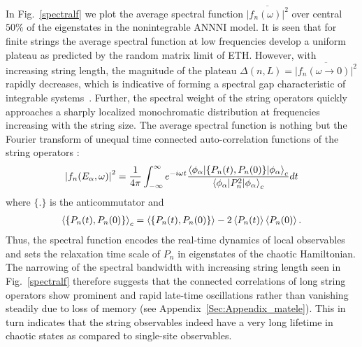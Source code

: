 \documentclass[aps,prx,twocolumn]{revtex4-2}
\begin{document}
{In Fig.~\ref{spectralf} we plot the average spectral function $\overline{|f_n(\omega)|^2}$ over central $50\%$ of the eigenstates in the nonintegrable ANNNI model. It is seen that for finite strings the average spectral function at low frequencies develop a uniform plateau as predicted by the random matrix limit of ETH.  However, with increasing string length, the  {magnitude of the plateau $\Delta(n,L)=\overline{|f_n(\omega\rightarrow 0)|^2}$ rapidly decreases,  which is indicative of forming a spectral gap characteristic of integrable systems~\cite{Pandey_2020}.  Further, the spectral weight of the string operators quickly approaches a sharply localized monochromatic distribution at frequencies increasing with the string size.  The average} spectral function is nothing but the Fourier transform of unequal time connected auto-correlation functions of the string operators \cite{srednicki99,lev21}:
\begin{equation}\label{eq:realtime}
	\left|f_n(E_{\alpha},\omega)\right|^2 = \frac{1}{4\pi}\int_{-\infty}^{\infty} e^{-i\omega t}\frac{\braket{\phi_{\alpha}|\{P_n(t),P_n(0)\}|\phi_{\alpha}}_c}{\braket{\phi_{\alpha}|P_n^2|\phi_{\alpha}}_c} dt
\end{equation}
where $\{.\}$ is the anticommutator and
\begin{eqnarray}
\nonumber\braket{\{P_n(t),P_n(0)\}}_c = \braket{\{P_n(t),P_n(0)\}}-2\braket{P_n(t)}\braket{P_n(0)}.
\end{eqnarray}
Thus, the spectral function encodes the real-time dynamics of local observables and sets the relaxation time scale of $P_n$ in eigenstates of the chaotic Hamiltonian.  {The narrowing of the spectral bandwidth with increasing string length seen in Fig.~\ref{spectralf} therefore suggests that the connected correlations of long string operators show prominent and rapid late-time oscillations rather than vanishing steadily due to loss of memory (see Appendix~\ref{Sec:Appendix_matele})}. This in turn indicates that the string observables indeed have a very long lifetime in chaotic states as compared to single-site observables.\\

}
\end{document}
